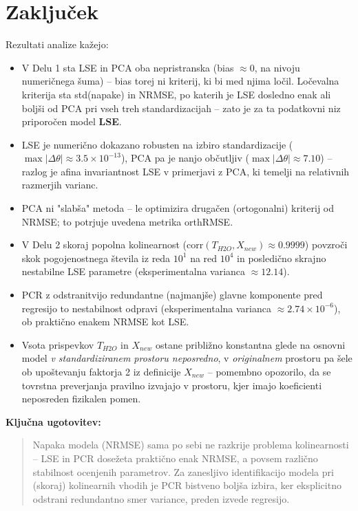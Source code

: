 \documentclass[a4paper, 11pt]{article}
\begin{document}
\section{Zaključek}

Rezultati analize kažejo:

\begin{sloppypar}
\begin{itemize}
    \item V Delu 1 sta LSE in PCA oba nepristranska (bias $\approx 0$, na nivoju
    numeričnega šuma) -- bias torej ni kriterij, ki bi med njima ločil. Ločevalna
    kriterija sta std(napake) in NRMSE, po katerih je LSE dosledno enak ali boljši od
    PCA pri vseh treh standardizacijah -- zato je za ta podatkovni niz priporočen model
    \textbf{LSE}.
    \item LSE je numerično dokazano robusten na izbiro standardizacije
    ($\max|\Delta\theta| \approx 3.5\times10^{-13}$), PCA pa je nanjo občutljiv
    ($\max|\Delta\theta| \approx 7.10$) -- razlog je afina invariantnost LSE v primerjavi
    z PCA, ki temelji na relativnih razmerjih varianc.
    \item PCA ni "slabša" metoda -- le optimizira drugačen (ortogonalni) kriterij od
    NRMSE; to potrjuje uvedena metrika orthRMSE.
    \item V Delu 2 skoraj popolna kolinearnost ($\mathrm{corr}(T_{H2O},X_{new})\approx0.9999$)
    povzroči skok pogojenostnega števila iz reda $10^1$ na red $10^4$ in posledično
    skrajno nestabilne LSE parametre (eksperimentalna varianca $\approx 12.14$).
    \item PCR z odstranitvijo redundantne (najmanjše) glavne komponente pred regresijo
    to nestabilnost odpravi (eksperimentalna varianca $\approx 2.74\times10^{-6}$), ob
    praktično enakem NRMSE kot LSE.
    \item Vsota prispevkov $T_{H2O}$ in $X_{new}$ ostane približno konstantna glede na
    osnovni model \emph{v standardiziranem prostoru neposredno}, v \emph{originalnem}
    prostoru pa šele ob upoštevanju faktorja 2 iz definicije $X_{new}$ -- pomembno
    opozorilo, da se tovrstna preverjanja pravilno izvajajo v prostoru, kjer imajo
    koeficienti neposreden fizikalen pomen.
\end{itemize}
\end{sloppypar}

\textbf{Ključna ugotovitev:}
\begin{quote}
Napaka modela (NRMSE) sama po sebi ne razkrije problema kolinearnosti -- LSE in PCR
dosežeta praktično enak NRMSE, a povsem različno stabilnost ocenjenih parametrov. Za
zanesljivo identifikacijo modela pri (skoraj) kolinearnih vhodih je PCR bistveno boljša
izbira, ker eksplicitno odstrani redundantno smer variance, preden izvede regresijo.
\end{quote}
\end{document}
